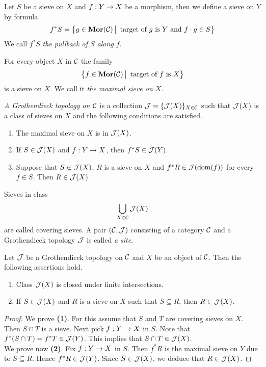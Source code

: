 \begin{definition}
Let $S$ be a sieve on $X$ and $f:Y\rightarrow X$ be a morphism, then we define a sieve on $Y$ by formula
$$f^*S=\big\{g\in \mathbf{Mor}({\mathcal C})\,\big|\,\mbox{ target of }g\mbox{ is }Y\mbox{ and }f\cdot g\in S\big\}$$
We call $f^*S$ \textit{the pullback of $S$ along $f$}.
\end{definition}

\begin{definition}
For every object $X$ in ${\mathcal C}$ the family 
$$\big\{f\in \mathbf{Mor}({\mathcal C})\,\big|\,\mbox{ target of }f\mbox{ is }X\big\}$$
is a sieve on $X$. We call it \textit{the maximal sieve on $X$}.
\end{definition}
 
\begin{definition}
\textit{A Grothendieck topology on ${\mathcal C}$} is a collection ${\mathcal J}=\{{\mathcal J}(X)\}_{X\in {\mathcal C}}$ such that ${\mathcal J}(X)$ is a class of sieves on $X$ and the following conditions are satisfied. 
\begin{enumerate}[label=\textbf{(\arabic*)}, leftmargin=1.5em]
\item The maximal sieve on $X$ is in ${\mathcal J}(X)$.
\item If $S\in {\mathcal J}(X)$ and $f:Y\rightarrow X$, then $f^*S\in {\mathcal J}(Y)$.
\item Suppose that $S\in {\mathcal J}(X)$, $R$ is a sieve on $X$ and $f^*R\in {\mathcal J}(\mathrm{dom}(f))$ for every $f\in S$. Then $R\in {\mathcal J}(X)$.
\end{enumerate}
Sieves in class
$$\bigcup_{X\in {\mathcal C}}{\mathcal J}(X)$$
are called covering sieves. A pair $({\mathcal C},{\mathcal J})$ consisting of a category ${\mathcal C}$ and a Grothendieck topology ${\mathcal J}$ is called \textit{a site}.
\end{definition}

\begin{proposition}\label{proposition:coveringsievesproperties}
Let ${\mathcal J}$ be a Grothendieck topology on ${\mathcal C}$ and $X$ be an object of ${\mathcal C}$. Then the following assertions hold.
\begin{enumerate}[label=\emph{\textbf{(\arabic*)}}, leftmargin=1.5em]
\item Class ${\mathcal J}(X)$ is closed under finite intersections.
\item If $S\in {\mathcal J}(X)$ and $R$ is a sieve on $X$ such that $S\subseteq R$, then $R\in {\mathcal J}(X)$.
\end{enumerate}
\end{proposition}
\begin{proof}
We prove \textbf{(1)}. For this assume that $S$ and $T$ are covering sieves on $X$. Then $S\cap T$ is a sieve. Next pick $f:Y\rightarrow X$ in $S$. Note that $f^*(S\cap T)=f^*T\in {\mathcal J}(Y)$. This implies that $S\cap T\in {\mathcal J}(X)$.\\
We prove now \textbf{(2)}. Fix $f:Y\rightarrow X$ in $S$. Then $f^*R$ is the maximal sieve on $Y$ due to $S\subseteq R$. Hence $f^*R\in {\mathcal J}(Y)$. Since $S\in {\mathcal J}(X)$, we deduce that $R\in {\mathcal J}(X)$.
\end{proof}

